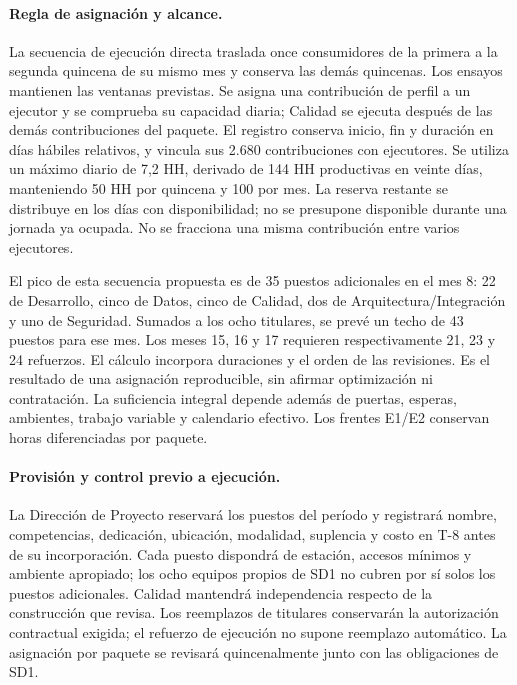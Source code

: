 \paragraph{Regla de asignación y alcance.}
La secuencia de ejecución directa traslada once consumidores de la primera a la segunda quincena de su mismo mes y conserva las demás quincenas. Los ensayos mantienen las ventanas previstas. Se asigna una contribución de perfil a un ejecutor y se comprueba su capacidad diaria; Calidad se ejecuta después de las demás contribuciones del paquete. El registro  conserva inicio, fin y duración en días hábiles relativos, y  vincula sus 2.680 contribuciones con ejecutores. Se utiliza un máximo diario de 7,2 HH, derivado de 144 HH productivas en veinte días, manteniendo 50 HH por quincena y 100 por mes. La reserva restante se distribuye en los días con disponibilidad; no se presupone disponible durante una jornada ya ocupada. No se fracciona una misma contribución entre varios ejecutores.



El pico de esta secuencia propuesta es de 35 puestos adicionales en el mes 8: 22 de Desarrollo, cinco de Datos, cinco de Calidad, dos de Arquitectura/Integración y uno de Seguridad. Sumados a los ocho titulares, se prevé un techo de 43 puestos para ese mes. Los meses 15, 16 y 17 requieren respectivamente 21, 23 y 24 refuerzos. El cálculo incorpora duraciones y el orden de las revisiones. Es el resultado de una asignación reproducible, sin afirmar optimización ni contratación. La suficiencia integral depende además de puertas, esperas, ambientes, trabajo variable y calendario efectivo. Los frentes E1/E2 conservan horas diferenciadas por paquete.

\paragraph{Provisión y control previo a ejecución.}
La Dirección de Proyecto reservará los puestos del período y registrará nombre, competencias, dedicación, ubicación, modalidad, suplencia y costo en T-8 antes de su incorporación. Cada puesto dispondrá de estación, accesos mínimos y ambiente apropiado; los ocho equipos propios de SD1 no cubren por sí solos los puestos adicionales. Calidad mantendrá independencia respecto de la construcción que revisa. Los reemplazos de titulares conservarán la autorización contractual exigida; el refuerzo de ejecución no supone reemplazo automático. La asignación por paquete se revisará quincenalmente junto con las obligaciones de SD1.

